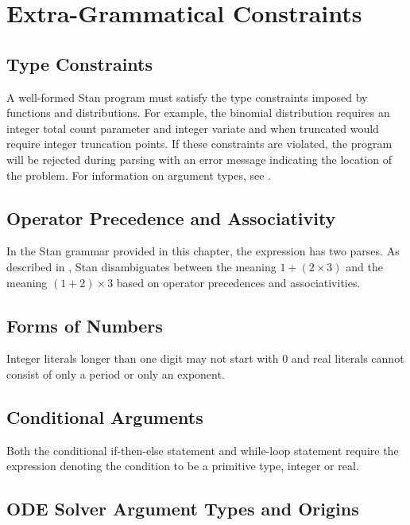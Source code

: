 \section{Extra-Grammatical Constraints}

\subsection{Type Constraints}

A well-formed Stan program must satisfy the type constraints imposed
by functions and distributions.  For example, the binomial
distribution requires an integer total count parameter and integer
variate and when truncated would require integer truncation points.
If these constraints are violated, the program will be rejected during
parsing with an error message indicating the location of the problem.
For information on argument types, see .

\subsection{Operator Precedence and Associativity}

In the Stan grammar provided in this chapter, the expression  has two parses.  As described in
, Stan disambiguates between the
meaning $1 + (2 \times 3)$ and the meaning $(1 + 2) \times 3$ based on
operator precedences and associativities.

\subsection{Forms of Numbers}

Integer literals longer than one digit may not start with 0 and real
literals cannot consist of only a period or only an exponent.

\subsection{Conditional Arguments}

Both the conditional if-then-else statement and while-loop statement
require the expression denoting the condition to be a primitive type,
integer or real.

\subsection{ODE Solver Argument Types and Origins}

